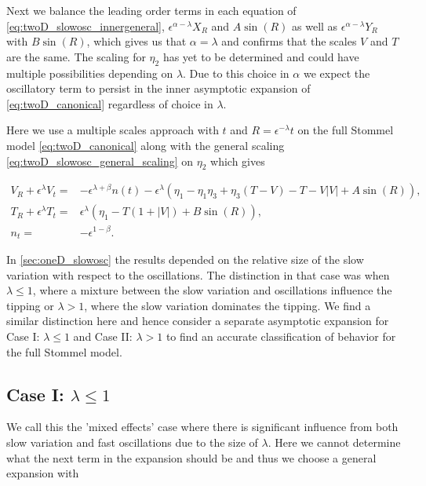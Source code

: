 Next we balance the leading order terms in each equation of \eqref{eq:twoD_slowosc_innergeneral}, $\epsilon^{\alpha-\lambda}X_R$ and $A\sin(R)$ as well as $\epsilon^{\alpha-\lambda}Y_R$ with $B\sin(R)$, which gives us that $\alpha=\lambda$ and confirms that the scales $V$ and $T$ are the same. The scaling for $\eta_2$ has yet to be determined and could have multiple possibilities depending on $\lambda$. Due to this choice in $\alpha$ we expect the oscillatory term to persist in the inner asymptotic expansion of \eqref{eq:twoD_canonical} regardless of choice in $\lambda$.

\indent Here we use a multiple scales approach with $t$ and $R=\epsilon^{-\lambda}t$ on the full Stommel model \eqref{eq:twoD_canonical} along with the general scaling \eqref{eq:twoD_slowosc_general_scaling} on $\eta_2$ which gives

\begin{equation}\label{eq:twoD_slowosc_general_outermulti}
\begin{aligned}
V_R+\epsilon^{\lambda}V_t =& -\epsilon^{\lambda+\beta}n(t)-\epsilon^{\lambda}(\eta_1-\eta_1\eta_3+\eta_3(T-V)-T-V|V|+A\sin(R)),\\
T_R+\epsilon^{\lambda}T_t =& \epsilon^\lambda(\eta_1-T(1+|V|)+B\sin(R)),\\
n_t =&-\epsilon^{1-\beta}.
\end{aligned}
\end{equation}

In \autoref{sec:oneD_slowosc} the results depended on the relative size of the slow variation with respect to the oscillations. The distinction in that case was when $\lambda\le1$, where a mixture between the slow variation and oscillations influence the tipping or $\lambda>1$, where the slow variation dominates the tipping. We find a similar distinction here and hence consider a separate asymptotic expansion for Case I: $\lambda\le 1$ and Case II: $\lambda >1$ to find an accurate classification of behavior for the full Stommel model.

\subsection{Case I: $\lambda \le 1$}

We call this the 'mixed effects' case where there is significant influence from both slow variation and fast oscillations due to the size of $\lambda$. Here we cannot determine what the next term in the expansion should be and thus we choose a general expansion with

